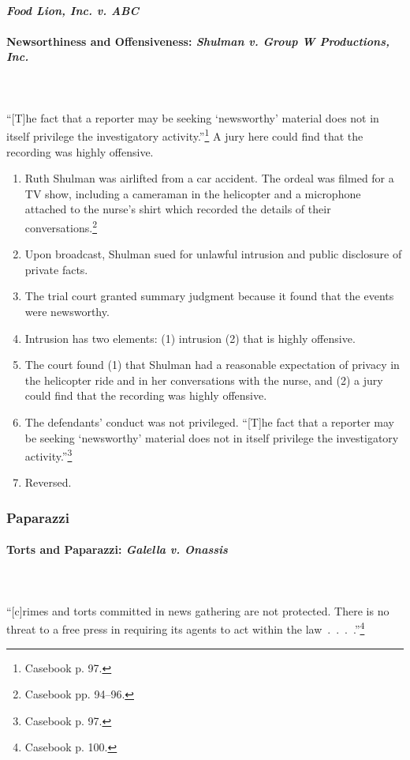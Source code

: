 \paragraph{\emph{Food Lion, Inc. v. ABC}}


\paragraph{Newsorthiness and Offensiveness: \emph{Shulman v. Group W 
Productions, Inc.}}
~\\\\
``[T]he fact that a reporter may be seeking `newsworthy' material does not in 
itself privilege the investigatory activity.''\footnote{Casebook p. 97.} A jury 
here could find that the recording was highly offensive.

\begin{enumerate}
    \item Ruth Shulman was airlifted from a car accident. The ordeal was filmed 
    for a TV show, including a cameraman in the helicopter and a microphone 
    attached to the nurse's shirt which recorded the details of their 
    conversations.\footnote{Casebook pp. 94--96.}
    \item Upon broadcast, Shulman sued for unlawful intrusion and public 
    disclosure of private facts.
    \item The trial court granted summary judgment because it found that the 
    events were newsworthy.
    \item Intrusion has two elements: (1) intrusion (2) that is highly 
    offensive.
    \item The court found (1) that Shulman had a reasonable expectation of 
    privacy in the helicopter ride and in her conversations with the nurse, and 
    (2) a jury could find that the recording was highly offensive.
    \item The defendants' conduct was not privileged. ``[T]he fact that a 
    reporter may be seeking `newsworthy' material does not in itself privilege 
    the investigatory activity.''\footnote{Casebook p. 97.}
    \item Reversed.
\end{enumerate}

\subsubsection{Paparazzi}

\paragraph{Torts and Paparazzi: \emph{Galella v. Onassis}}
~\\\\
``[c]rimes and torts committed in news gathering are not protected. There is no 
threat to a free press in requiring its agents to act within the 
law~.~.~.~.''\footnote{Casebook p. 100.}

